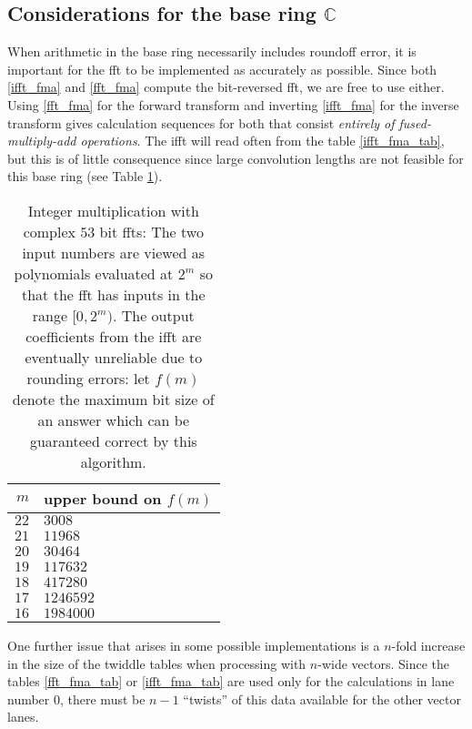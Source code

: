 \documentclass[12 pt]{amsart}
\newcommand\T{\rule{0pt}{-1.0ex}}       %
\newcommand\B{\rule[0.5ex]{0pt}{0pt}} %
\begin{document}
\subsection{Considerations for the base ring $\mathbb{C}$}
\label{section_CC}
When arithmetic in the base ring necessarily includes roundoff error, it is
important for the fft to be implemented as accurately as possible. Since both
\eqref{ifft_fma} and \eqref{fft_fma} compute the bit-reversed fft, we are free
to use either. Using \eqref{fft_fma} for the forward transform and inverting
\eqref{ifft_fma} for the inverse transform gives calculation sequences for both
that consist \emph{entirely of fused-multiply-add operations}. The ifft will
read often from the table \eqref{ifft_fma_tab}, but this is of little
consequence since large convolution lengths are not feasible for this base ring
(see Table \ref{doubles_suck}).
\begin{table}
\caption{Integer multiplication with complex $53$ bit ffts: The two input
numbers are viewed as polynomials evaluated at $2^m$ so that the fft has inputs
in the range $[0,2^m)$. The output coefficients from the ifft are eventually
unreliable due to rounding errors: let $f(m)$ denote the maximum
bit size of an answer which can be guaranteed correct by this algorithm.}
\label{doubles_suck}
\begin{tabular}{r|l}
$m$ & upper bound on $f(m)$\\
\hline
$22$ & $3008$\T\B\\
$21$ & $11968$\T\B\\
$20$ & $30464$\T\B\\
$19$ & $117632$\T\B\\
$18$ & $417280$\T\B\\
$17$ & $1246592$\T\B\\
$16$ & $1984000$\T\B
\end{tabular} 
\end{table}
One further issue that arises in some possible implementations is a $n$-fold
increase in the size of the twiddle tables when processing with $n$-wide
vectors. Since the tables \eqref{fft_fma_tab} or \eqref{ifft_fma_tab} are used
only for the calculations in lane number $0$, there must be $n-1$ ``twists'' of
this data available for the other vector lanes.
\end{document}
